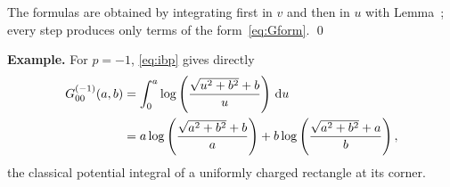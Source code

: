 \vspace{\baselineskip}
\proof
The formulas are obtained by integrating first in $v$ and then in $u$ with Lemma~; every step
produces only terms of the form~\eqref{eq:Gform}. \qed

\vspace{\baselineskip}
\noindent\textbf{Example.} For $p=-1$, \eqref{eq:ibp} gives directly
\begin{equation}
    \begin{aligned}
    G^{(-1)}_{00}(a,b) &= \int_0^a\log\left(\frac{\sqrt{u^2+b^2}+b}{u}\right)\,\mathrm{d} u\\
    &= a\log\left(\frac{\sqrt{a^2+b^2}+b}{a}\right) + b\log\left(\frac{\sqrt{a^2+b^2}+a}{b}\right),
    \end{aligned}
\end{equation}
the classical potential integral of a uniformly charged rectangle at its corner.
